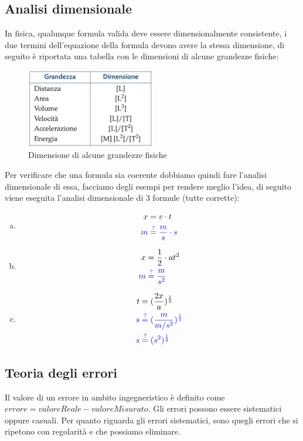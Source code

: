 \documentclass[../main.tex]{subfiles}
\begin{document}
\pagebreak
\subsection{Analisi dimensionale}
In fisica, qualunque formula valida deve essere dimensionalmente consistente, i due termini dell'equazione della formula devono avere la stessa dimensione, di seguito è riportata una tabella con le dimensioni di alcune grandezze fisiche:
\begin{figure}[h]
    \centering
    \includegraphics[width=0.5\textwidth]{images/dimensioni.png}
    \caption{Dimensione di alcune grandezze fisiche}
\end{figure}
Per verificare che una formula sia coerente dobbiamo quindi fare l'analisi dimensionale di essa, facciamo degli esempi per rendere meglio l'idea, di seguito viene eseguita l'analisi dimensionale di 3 formule (tutte corrette):

\begin{enumerate}[a)]
    \item \begin{align*}
        x&=v\cdot t \\
        \color{blue} m&\color{blue} \stackrel{?}{=} \frac{m}{s} \cdot s
    \end{align*}
    \item \begin{align*}
        x&=\frac{1}{2}\cdot at^2 \\
        \color{blue} m&\color{blue}\stackrel{?}{=} \frac{m}{s^2}
    \end{align*}
    \item \begin{align*}
        t&=(\frac{2x}{a})^{\frac{1}{2}} \\
        \color{blue} s&\color{blue}\stackrel{?}{=} (\frac{m}{m/s^2})^{\frac{1}{2}} \\
        \color{blue}s&\color{blue}\stackrel{?}{=}(s^2)^\frac{1}{2}
    \end{align*}
\end{enumerate}

\pagebreak
\subsection{Teoria degli errori}
Il valore di un errore in ambito ingegneristico è definito come \\$errore=valoreReale- valoreMisurato$. Gli errori possono essere sistematici oppure casuali. Per quanto riguarda gli errori sistematici, sono quegli errori che si ripetono con regolarità e che possiamo eliminare.
\end{document}
